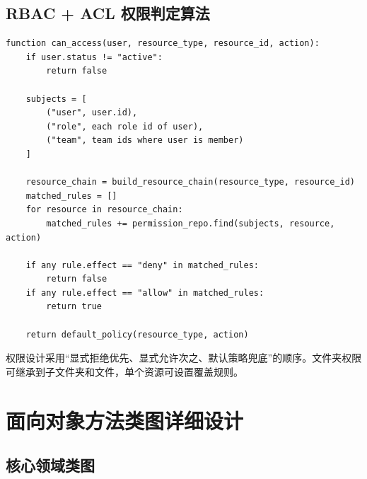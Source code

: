 \documentclass[a4paper,zihao=-4]{ctexart}
\begin{document}
\hypertarget{rbac-acl-ux6743ux9650ux5224ux5b9aux7b97ux6cd5}{%
\subsection{RBAC + ACL
权限判定算法}\label{rbac-acl-ux6743ux9650ux5224ux5b9aux7b97ux6cd5}}

\begin{lstlisting}
function can_access(user, resource_type, resource_id, action):
    if user.status != "active":
        return false

    subjects = [
        ("user", user.id),
        ("role", each role id of user),
        ("team", team ids where user is member)
    ]

    resource_chain = build_resource_chain(resource_type, resource_id)
    matched_rules = []
    for resource in resource_chain:
        matched_rules += permission_repo.find(subjects, resource, action)

    if any rule.effect == "deny" in matched_rules:
        return false
    if any rule.effect == "allow" in matched_rules:
        return true

    return default_policy(resource_type, action)
\end{lstlisting}

权限设计采用``显式拒绝优先、显式允许次之、默认策略兜底''的顺序。文件夹权限可继承到子文件夹和文件，单个资源可设置覆盖规则。

\hypertarget{ux9762ux5411ux5bf9ux8c61ux65b9ux6cd5ux7c7bux56feux8be6ux7ec6ux8bbeux8ba1}{%
\section{面向对象方法类图详细设计}\label{ux9762ux5411ux5bf9ux8c61ux65b9ux6cd5ux7c7bux56feux8be6ux7ec6ux8bbeux8ba1}}

\hypertarget{ux6838ux5fc3ux9886ux57dfux7c7bux56fe}{%
\subsection{核心领域类图}\label{ux6838ux5fc3ux9886ux57dfux7c7bux56fe}}
\end{document}
